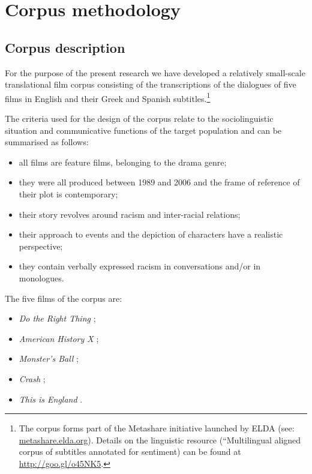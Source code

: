 \documentclass[output=paper]{LSP/langsci}
\begin{document}
\section{Corpus methodology} \label{sec:2:3}

\subsection{Corpus description} \label{sec:2:3:1}

For the purpose of the present research we have developed a relatively small-scale translational film corpus consisting of the transcriptions of the dialogues of five films in English and their Greek and Spanish subtitles.\footnote{The corpus forms part of the Metashare initiative launched by ELDA (see: \url{metashare.elda.org}). Details on the linguistic resource (“Multilingual aligned corpus of subtitles annotated for sentiment) can be found at \url{http://goo.gl/o45NK5}.}

The criteria used for the design of the corpus relate to the sociolinguistic situation and communicative functions \citep[49--52]{Saridakis2010} of the target population and can be summarised as follows:

\begin{itemize}
\item all films are feature films, belonging to the drama genre;
\item they were all produced between 1989 and 2006 and the frame of reference of their plot is contemporary;
\item their story revolves around racism and inter-racial relations;
\item their approach to events and the depiction of characters have a realistic perspective;
\item they contain verbally expressed racism in conversations and/or in monologues.
\end{itemize}

The five films of the corpus are:

\begin{itemize}
\item \textit{Do the Right Thing} \citep{Lee1989};
\item \textit{American History X} \citep{Kaye1998};
\item \textit{Monster's Ball} \citep{Forster2001};
\item \textit{Crash} \citep{Haggis2004};
\item \textit{This is England} \citep{Meadows2006}.
\end{itemize}
\end{document}
